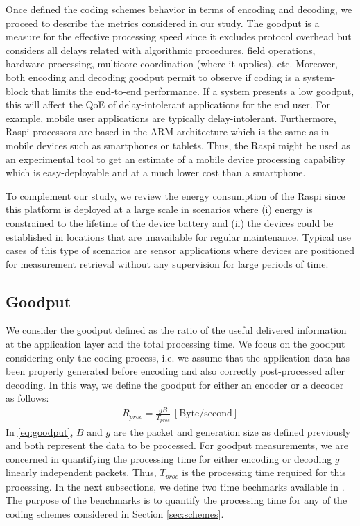 \label{sec:metrics}

Once defined the coding schemes behavior in terms of encoding
and decoding, we proceed to describe the metrics considered in our study.
The goodput is a measure for the effective processing speed since it
excludes protocol overhead but considers all delays related with
algorithmic procedures, field operations, hardware processing, multicore
coordination (where it applies), etc. Moreover, both encoding and decoding
goodput permit to observe if coding is a system-block that limits the
end-to-end performance. If a system presents a low goodput, this will
affect the \ac{QoE} of delay-intolerant applications for the end user.
For example, mobile user applications are typically delay-intolerant.
Furthermore, \ac{Raspi} processors are based in the \ac{ARM} architecture
which is the same as in mobile devices such as smartphones or tablets.
Thus, the \ac{Raspi} might be used as an experimental tool to get an
estimate of a mobile device processing capability which is easy-deployable
and at a much lower cost than a smartphone.

To complement our study, we review the energy consumption of the \ac{Raspi}
since this platform is deployed at a large scale in scenarios where (i)
energy is constrained to the lifetime of the device battery and (ii) the
devices could be established in locations that are unavailable for
regular maintenance. Typical use cases of this type of scenarios are
sensor applications where devices are positioned for measurement retrieval
without any supervision for large periods of time.

\subsection{Goodput}
We consider the goodput defined as the ratio of the useful delivered
information at the application layer and the total processing time. We focus
on the goodput considering only the coding process, i.e. we assume that
the application data has been properly generated before encoding and
also correctly post-processed after decoding. In this way, we define
the goodput for either an encoder or a decoder as follows:
%
\begin{align} \label{eq:goodput}
R_{proc} = \frac{gB}{T_{proc}} ~ [\mathrm{Byte/second}]
\end{align}
%
In \eqref{eq:goodput}, $B$ and $g$ are the packet and generation size
as defined previously and both represent the data to be processed. For
goodput measurements, we are concerned in quantifying the processing time
for either encoding or decoding $g$ linearly independent packets. Thus, $T_{proc}$ is
the processing time required for this processing. In the next subsections, we
define two time bechmarks available in \cite{soerensen2016sparse}.
The purpose of the benchmarks is to quantify the processing time for
any of the coding schemes considered in Section \ref{sec:schemes}.


